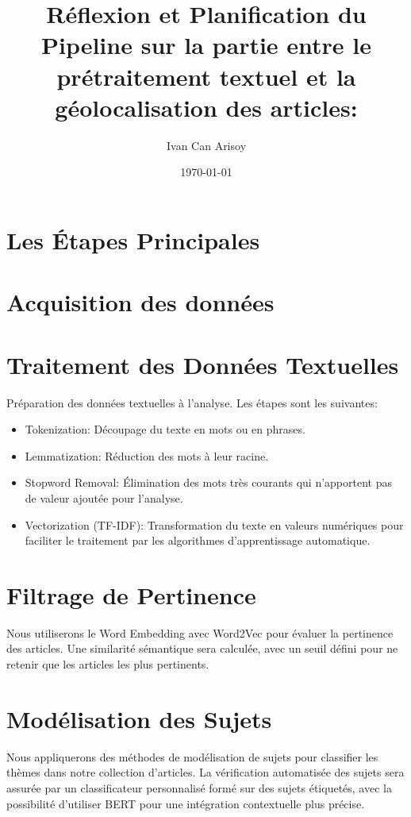 \documentclass{article}
\title{Réflexion et Planification du Pipeline sur la partie entre le prétraitement textuel et la géolocalisation des articles:}
\author{Ivan Can Arisoy}
\date{\today}
\begin{document}
\maketitle

\section*{Les Étapes Principales}

\section{Acquisition des données}

\section{Traitement des Données Textuelles}
Préparation des données textuelles à l'analyse. Les étapes sont les suivantes:
\begin{itemize}
\item Tokenization: Découpage du texte en mots ou en phrases.
\item Lemmatization: Réduction des mots à leur racine.
\item Stopword Removal: Élimination des mots très courants qui n'apportent pas de valeur ajoutée pour l'analyse.
\item Vectorization (TF-IDF): Transformation du texte en valeurs numériques pour faciliter le traitement par les algorithmes d'apprentissage automatique.
\end{itemize}

\section{Filtrage de Pertinence}
Nous utiliserons le Word Embedding avec Word2Vec pour évaluer la pertinence des articles. Une similarité sémantique sera calculée, avec un seuil défini pour ne retenir que les articles les plus pertinents.

\section{Modélisation des Sujets}
Nous appliquerons des méthodes de modélisation de sujets pour classifier les thèmes dans notre collection d'articles. La vérification automatisée des sujets sera assurée par un classificateur personnalisé formé sur des sujets étiquetés, avec la possibilité d'utiliser BERT pour une intégration contextuelle plus précise.
\end{document}
